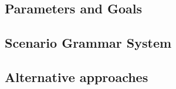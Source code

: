\subsection{Parameters and Goals}

\subsection{Scenario Grammar System}
  
 

 


 \subsection{Alternative approaches}
 